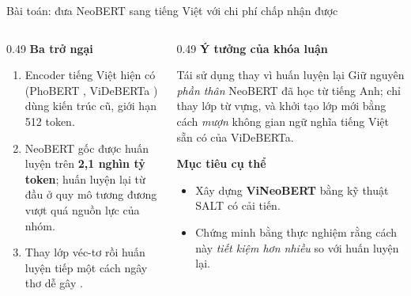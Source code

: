 \begin{frame}{Bài toán: đưa NeoBERT sang tiếng Việt với chi phí chấp nhận được}
\vspace{0.2em}
\begin{columns}[T]
\begin{column}{0.49\textwidth}
  \textbf{Ba trở ngại}
  \begin{enumerate}\itemsep2pt
    \item Encoder tiếng Việt hiện có (PhoBERT ,
          ViDeBERTa ) dùng kiến trúc cũ, giới hạn 512 token.
    \item NeoBERT gốc được huấn luyện trên \textbf{2,1 nghìn tỷ token};
          huấn luyện lại từ đầu ở quy mô tương đương vượt quá nguồn lực
          của nhóm.
    \item Thay lớp véc-tơ rồi huấn luyện tiếp một cách ngây thơ dễ gây
          .
  \end{enumerate}
\end{column}

\begin{column}{0.49\textwidth}
  \textbf{Ý tưởng của khóa luận}

  \vspace{2pt}
  \begin{block}{Tái sử dụng thay vì huấn luyện lại}
    Giữ nguyên \emph{phần thân} NeoBERT đã học từ tiếng Anh; chỉ thay
    lớp từ vựng, và khởi tạo lớp mới bằng cách \emph{mượn} không gian
    ngữ nghĩa tiếng Việt sẵn có của ViDeBERTa.
  \end{block}

  \vspace{2pt}
  \textbf{Mục tiêu cụ thể}
  \begin{itemize}\itemsep1pt
    \item Xây dựng \textbf{ViNeoBERT} bằng kỹ thuật SALT 
          có cải tiến.
    \item Chứng minh bằng thực nghiệm rằng cách này \emph{tiết kiệm hơn
          nhiều} so với huấn luyện lại.
  \end{itemize}
\end{column}
\end{columns}
\end{frame}
